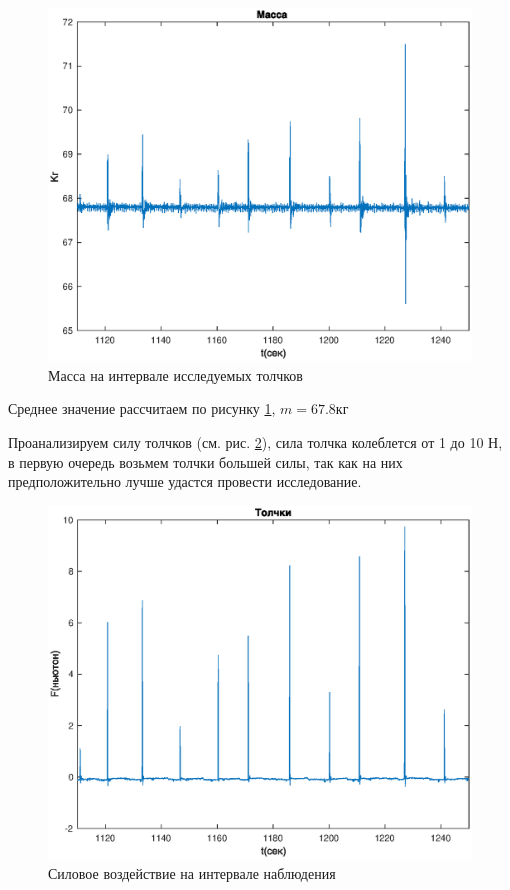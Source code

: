 \documentclass[a4paper,12pt, openany]{book}
\theoremstyle{plain} %
\theoremstyle{definition} %
\theoremstyle{remark} %
\numberwithin{equation}{chapter}
\begin{document}
{\begin{figure}[h!]
\begin{center}
\begin{minipage}[h]{0.46\linewidth}
            \includegraphics[width=1\linewidth]{mass_concrete.eps}
            \caption{Масса на интервале исследуемых толчков}
            \label{mass_short_time}
        \end{minipage}
    \end{center}
\end{figure}

Среднее значение рассчитаем по рисунку \ref{mass_short_time}, $m=67.8$кг

Проанализируем силу толчков (см. рис. \ref{pushes_real}), сила толчка колеблется от 1 до 10 Н,
в первую очередь возьмем толчки большей силы, так как на них предположительно лучше удастся провести исследование.

\begin{figure}[h!]
    \centering
    \includegraphics[width=0.9\linewidth]{pushes_real.eps}
    \caption{Силовое воздействие на интервале наблюдения}
    \label{pushes_real}
\end{figure}

}
\end{document}
